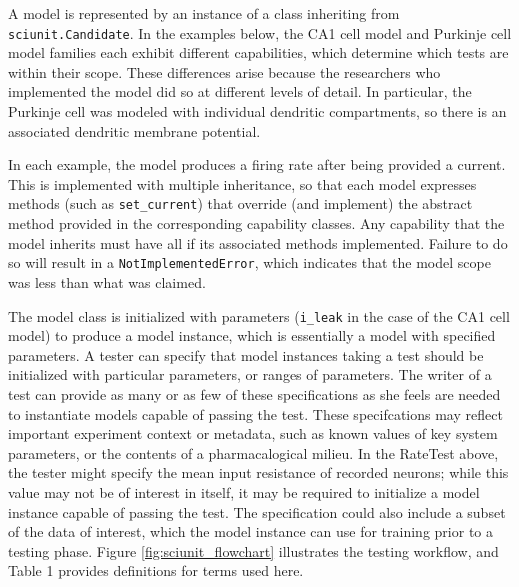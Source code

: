 \documentclass[11pt,letterpaper]{article}
\begin{document}
A model is represented by an instance of a class inheriting from \verb|sciunit.Candidate|.  In the examples below, the CA1 cell model and Purkinje cell model families each exhibit different capabilities, which determine which tests are within their scope.  These differences arise because the researchers who implemented the model did so at different levels of detail.  In particular, the Purkinje cell was modeled with individual dendritic compartments, so there is an associated dendritic membrane potential. 

In each example, the model produces a firing rate after being provided a current.  This is implemented with multiple inheritance, so that each model expresses methods (such as \verb|set_current|) that override (and implement) the abstract method provided in the corresponding capability classes.  Any capability that the model inherits must have all if its associated methods implemented.  Failure to do so will result in a \verb|NotImplementedError|, which indicates that the model scope was less than what was claimed.  

The model class is initialized with parameters (\verb|i_leak| in the case of the CA1 cell model) to produce a model instance, which is essentially a model with specified parameters.  A tester can specify that model instances taking a test should be initialized with particular parameters, or ranges of parameters. The writer of a test can provide as many or as few of these specifications as she feels are needed to instantiate models capable of passing the test.  These specifcations may reflect important experiment context or metadata, such as known values of key system parameters, or the contents of a pharmacalogical milieu.  In the RateTest above, the tester might specify the mean input resistance of recorded neurons; while this value may not be of interest in itself, it may be required to initialize a model instance capable of passing the test.  The specification could also include a subset of the data of interest, which the model instance can use for training prior to a testing phase.  Figure \ref{fig:sciunit_flowchart} illustrates the testing workflow, and Table 1 provides definitions for terms used here.  

\end{document}
